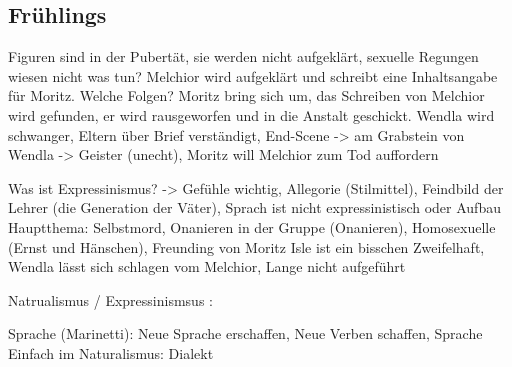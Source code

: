 \documentclass[a4paper]{article}
\begin{document}
\subsection{Frühlings}

Figuren 
sind in der Pubertät, sie werden nicht aufgeklärt, sexuelle Regungen wiesen nicht was tun?
Melchior wird aufgeklärt und schreibt eine Inhaltsangabe für Moritz. Welche Folgen? Moritz bring sich um, das Schreiben von Melchior wird gefunden, er wird rausgeworfen und in die Anstalt geschickt.
Wendla wird schwanger, Eltern über Brief verständigt,
End-Scene -> am Grabstein von Wendla -> Geister (unecht), Moritz will Melchior zum Tod auffordern

Was ist Expressinismus? -> Gefühle wichtig, Allegorie (Stilmittel), Feindbild der Lehrer (die Generation der Väter), Sprach ist nicht expressinistisch oder Aufbau
Hauptthema: Selbstmord, Onanieren in der Gruppe (Onanieren), Homosexuelle (Ernst und Hänschen), Freunding von Moritz Isle ist ein bisschen Zweifelhaft, Wendla lässt sich schlagen vom Melchior, Lange nicht aufgeführt

Natrualismus / Expressinismsus :

Sprache (Marinetti): Neue Sprache erschaffen, Neue Verben schaffen, 
Sprache Einfach im Naturalismus: Dialekt
\end{document}
